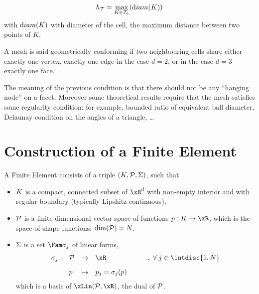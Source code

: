 \begin{dfntn}
\begin{equation*}
h_{\mathcal T} = \max_{K\in{\mathcal T}_h}({\mathrm diam}(K))
\end{equation*}
with ${\mathrm diam}(K)$ with diameter of the cell, \ie the maximum distance between two points of $K$.
\end{dfntn}

\begin{dfntn}
A mesh is said geometrically conforming if two neighbouring cells share either exactly one vertex, exactly one edge in the case $d = 2$, or in the case $d = 3$ exactly one face.
\end{dfntn}

\medskip
The meaning of the previous condition is that there should not be any ``hanging node'' on a facet.
Moreover some theoretical results require that the mesh satisfies some regularity condition: for example, bounded ratio of equivalent ball diameter, Delaunay condition on the angles of a triangle, \dots

\section{Construction of a Finite Element}

\begin{dfntn}
A Finite Element consists of a triple ${({K},{\mathcal P}, {\Sigma})}$, such that
\begin{itemize}
\item ${K}$ is a compact, connected subset of $\xR^d$ with non-empty interior and with regular boundary (typically Lipshitz continuous),
\item ${\mathcal P}$ is a finite dimensional vector space of functions $p : K \rightarrow \xR$, which is the space of shape functions; $\dim({\mathcal P}) = N$.
\item ${\Sigma}$ is a set $\Fam \sigma_j$ of linear forms,
\begin{equation*}
\begin{array}{lllll}
\sigma_j:& \SpaceP & \rightarrow & \xR &\qquad  ,\; \forany j \in \intdisc{1,N}\\[2ex]
\hfill   & p       & \mapsto     & p_j = \sigma_j(p) &
\end{array}
\end{equation*}
which is a basis of $\xLin(\SpaceP,\xR)$, the dual of ${\mathcal P}$.
\end{itemize}
\end{dfntn}

